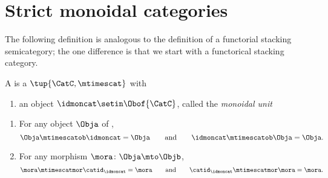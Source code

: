 
\section{Strict monoidal categories}
\label{sec:strict-monoidal-categories}

The following definition is analogous to the definition of a functorial stacking semicategory; the one difference is that we start with a functorical stacking category. 

\begin{ctdefinition}
    \label{def:strict-monoidal-category}
     A  is a  $\tup{\CatC, \mtimescat}$ with

    \constit

    \begin{enumerate}
        \item an object $\idmoncat \setin \Obof{\CatC}$, called the \emph{monoidal unit}
    \end{enumerate}

    \condit

    \begin{enumerate}
        \item For any object $\Obja$ of \CatC,
              \begin{equation}
                  \Obja \mtimescatob \idmoncat = \Obja \qquad \text{and} \qquad \idmoncat \mtimescatob \Obja = \Obja.
              \end{equation}
        \item For any morphism $\mora \colon \Obja \mto \Objb$,
              \begin{equation}
                  \mora \mtimescatmor \catid_\idmoncat = \mora \qquad \text{and} \qquad \catid_\idmoncat \mtimescatmor  \mora = \mora.
              \end{equation}
    \end{enumerate}
\end{ctdefinition}




